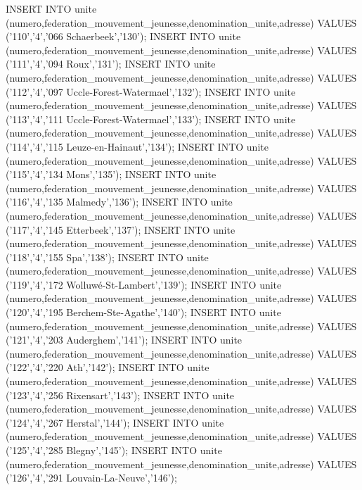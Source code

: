 INSERT INTO unite (numero,federation_mouvement_jeunesse,denomination_unite,adresse) VALUES ('110','4','066 Schaerbeek','130');
INSERT INTO unite (numero,federation_mouvement_jeunesse,denomination_unite,adresse) VALUES ('111','4','094 Roux','131');
INSERT INTO unite (numero,federation_mouvement_jeunesse,denomination_unite,adresse) VALUES ('112','4','097 Uccle-Forest-Watermael','132');
INSERT INTO unite (numero,federation_mouvement_jeunesse,denomination_unite,adresse) VALUES ('113','4','111 Uccle-Forest-Watermael','133');
INSERT INTO unite (numero,federation_mouvement_jeunesse,denomination_unite,adresse) VALUES ('114','4','115 Leuze-en-Hainaut','134');
INSERT INTO unite (numero,federation_mouvement_jeunesse,denomination_unite,adresse) VALUES ('115','4','134 Mons','135');
INSERT INTO unite (numero,federation_mouvement_jeunesse,denomination_unite,adresse) VALUES ('116','4','135 Malmedy','136');
INSERT INTO unite (numero,federation_mouvement_jeunesse,denomination_unite,adresse) VALUES ('117','4','145 Etterbeek','137');
INSERT INTO unite (numero,federation_mouvement_jeunesse,denomination_unite,adresse) VALUES ('118','4','155 Spa','138');
INSERT INTO unite (numero,federation_mouvement_jeunesse,denomination_unite,adresse) VALUES ('119','4','172 Wolluwé-St-Lambert','139');
INSERT INTO unite (numero,federation_mouvement_jeunesse,denomination_unite,adresse) VALUES ('120','4','195 Berchem-Ste-Agathe','140');
INSERT INTO unite (numero,federation_mouvement_jeunesse,denomination_unite,adresse) VALUES ('121','4','203 Auderghem','141');
INSERT INTO unite (numero,federation_mouvement_jeunesse,denomination_unite,adresse) VALUES ('122','4','220 Ath','142');
INSERT INTO unite (numero,federation_mouvement_jeunesse,denomination_unite,adresse) VALUES ('123','4','256 Rixensart','143');
INSERT INTO unite (numero,federation_mouvement_jeunesse,denomination_unite,adresse) VALUES ('124','4','267 Herstal','144');
INSERT INTO unite (numero,federation_mouvement_jeunesse,denomination_unite,adresse) VALUES ('125','4','285 Blegny','145');
INSERT INTO unite (numero,federation_mouvement_jeunesse,denomination_unite,adresse) VALUES ('126','4','291 Louvain-La-Neuve','146');

